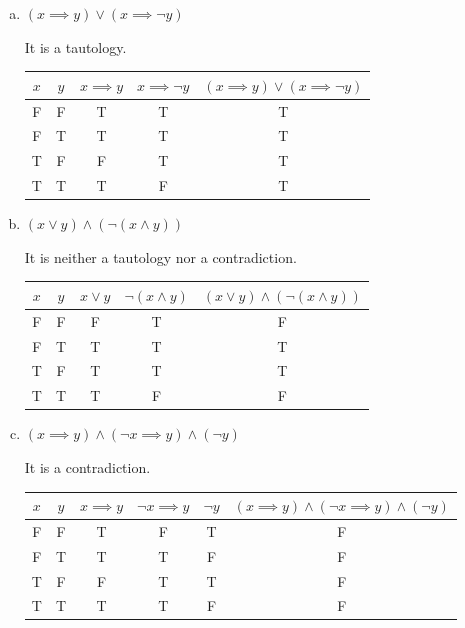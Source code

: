 \documentclass{article}
\begin{document}
\begin{enumerate}[(a)]
    \item $(x \implies y) \lor (x \implies \neg y)$
    
    It is a tautology.
    
    \begin{tabular}{|c|c|c|c|c|}
        \hline
        $x$ & $y$ & $x \implies y$ & $ x \implies \neg y$ & $(x \implies y) \lor (x \implies \neg y)$ \\
        \hline
        F & F & T & T & T \\
        F & T & T & T & T \\
        T & F & F & T & T \\
        T & T & T & F & T \\
        \hline
    \end{tabular}
    
    \item $(x \lor y) \land \left( \neg (x \land y) \right)$
    
    It is neither a tautology nor a contradiction.
    
    \begin{tabular}{|c|c|c|c|c|}
        \hline
        $x$ & $y$ & $x \lor y$ & $\neg (x \land y)$ & $(x \lor y) \land \left( \neg (x \land y) \right)$ \\
        \hline
        F & F & F & T & F \\
        F & T & T & T & T \\
        T & F & T & T & T \\
        T & T & T & F & F \\
        \hline
    \end{tabular}
    
    \item $(x \implies y) \land (\neg x \implies y) \land (\neg y)$
    
    It is a contradiction.
    
    \begin{tabular}{|c|c|c|c|c|c|}
        \hline
        $x$ & $y$ & $x \implies y$ & $\neg x \implies y$ & $\neg y$ & $(x \implies y) \land (\neg x \implies y) \land (\neg y)$ \\
        \hline
        F & F & T & F & T & F \\
        F & T & T & T & F & F \\
        T & F & F & T & T & F \\
        T & T & T & T & F & F \\
        \hline
    \end{tabular}
    
\end{enumerate}
\end{document}
